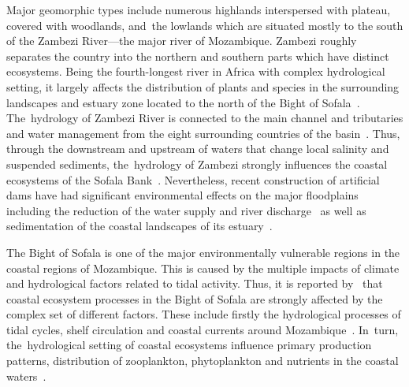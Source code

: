 \documentclass[coasts,article,accept,pdftex,oneauthor]{Definitions/mdpi}
\begin{document}
Major geomorphic types include numerous highlands interspersed with plateau, covered with woodlands, and~the lowlands {which are }situated mostly to the south of the Zambezi River{---}the major river of Mozambique. Zambezi roughly {separates} the country into the northern and southern parts {which have} distinct ecosystems. Being the fourth-longest river in Africa with complex hydrological setting, it largely affects the distribution of plants and species in the surrounding landscapes and estuary zone located to the north of the Bight of Sofala~\cite{Dunham,Dunham1991,Simasiku}. The~hydrology of Zambezi River is connected to the main channel and tributaries and water management from the eight surrounding countries of the basin~\cite{Mbumwae}. {Thus}, through the downstream and upstream of waters that change local salinity and suspended sediments, the~hydrology of Zambezi strongly influences the coastal ecosystems of the Sofala Bank~\cite{NEHAMA2021101891}. {Nevertheless, recent construction of artificial} dams have had significant environmental effects on the major floodplains including the reduction of the water supply and river discharge~\cite{Gope} as well as sedimentation of the coastal landscapes of its estuary~\cite{Moore}. 

The Bight of Sofala is one of the major environmentally vulnerable regions in the coastal regions of Mozambique. This is caused by the multiple impacts of climate and hydrological factors related to tidal activity. Thus, it is reported by~\cite{LEAL2009605} that{ }coastal ecosystem processes in the Bight of Sofala are strongly affected by the complex set of different factors. These include firstly the hydrological processes of tidal cycles, shelf circulation and coastal currents around Mozambique~\cite{MALAUENE20181}. In~turn, the~hydrological setting of coastal ecosystems influence primary production patterns, distribution of zooplankton, phytoplankton and nutrients in the coastal waters~\cite{MALAUENE2021107268}.
\end{document}
